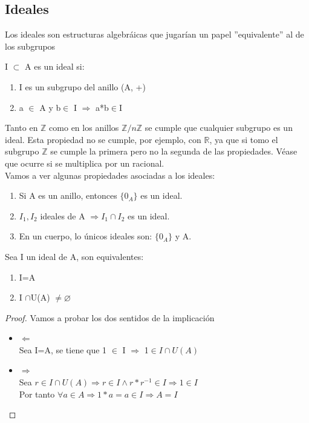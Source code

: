 \documentclass[nochap]{apuntes}
\begin{document}
\subsection{Ideales}
Los ideales son estructuras algebráicas que jugarían un papel ''equivalente'' al de los subgrupos
\begin{defn}[Ideal]
 I $\subset$ A es un ideal si:
 \begin{enumerate}
  \item I es un subgrupo del anillo (A, +)
  \item a $\in$ A y b$\in$ I $\Rightarrow$  a*b$\in$I
 \end{enumerate}
\end{defn}

Tanto en $\mathbb{Z}$  como en los anillos $\mathbb{Z}/n\mathbb{Z}$  se cumple que cualquier subgrupo es un ideal. Esta propiedad no se cumple,
por ejemplo, con $\mathbb{R}$, ya que si tomo el subgrupo $\mathbb{Z}$  se cumple la primera pero no la segunda de las propiedades. Véase
que ocurre si se multiplica por un racional.\\

Vamos a ver algunas propiedades asociadas a los ideales:
\begin{enumerate}
 \item Si A es un anillo, entonces $\{0_A\}$  es un ideal.
 \item $I_1, I_2$  ideales de A $\Rightarrow I_1 \cap I_2$  es un ideal.
 \item En un cuerpo, lo únicos ideales son: $\{0_A\}$  y A.
\end{enumerate}

Sea I un ideal de A, son equivalentes:
\begin{enumerate}
 \item I=A
 \item I $\cap$U(A) $\neq \varnothing$
\end{enumerate}
\begin{proof}
Vamos a probar los dos sentidos de la implicación
 \begin{itemize}
  \item $\Leftarrow$\\
  Sea I=A, se tiene que 1 $\in$ I $\Rightarrow$ 1$\in I\cap U(A)$
  \item $\Rightarrow$\\
  Sea $r \in I \cap U(A) \Rightarrow r \in I \wedge r*r^{-1}\in I \Rightarrow 1\in I$\\
  Por tanto $\forall a \in A \Rightarrow 1*a=a\in I \Rightarrow A=I$
 \end{itemize}

\end{proof}
\end{document}
